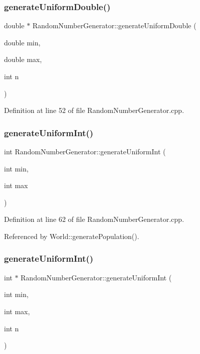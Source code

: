 \subsubsection{generateUniformDouble()\hspace{0.1cm}{\footnotesize\ttfamily [2/2]}}
{\footnotesize\ttfamily double $\ast$ Random\+Number\+Generator\+::generate\+Uniform\+Double (\begin{DoxyParamCaption}\item[{double}]{min,  }\item[{double}]{max,  }\item[{int}]{n }\end{DoxyParamCaption})}



Definition at line 52 of file Random\+Number\+Generator.\+cpp.

\mbox{\label{class_random_number_generator_ae2bbbe3f14737ce9eaa573e26e873b5a}} 
\subsubsection{generateUniformInt()\hspace{0.1cm}{\footnotesize\ttfamily [1/2]}}
{\footnotesize\ttfamily int Random\+Number\+Generator\+::generate\+Uniform\+Int (\begin{DoxyParamCaption}\item[{int}]{min,  }\item[{int}]{max }\end{DoxyParamCaption})}



Definition at line 62 of file Random\+Number\+Generator.\+cpp.



Referenced by World\+::generate\+Population().

\mbox{\label{class_random_number_generator_a13a2a601a80e21008ab04dc15f1f0c0e}} 
\subsubsection{generateUniformInt()\hspace{0.1cm}{\footnotesize\ttfamily [2/2]}}
{\footnotesize\ttfamily int $\ast$ Random\+Number\+Generator\+::generate\+Uniform\+Int (\begin{DoxyParamCaption}\item[{int}]{min,  }\item[{int}]{max,  }\item[{int}]{n }\end{DoxyParamCaption})}



